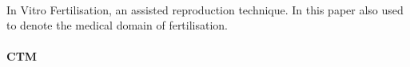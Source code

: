 \paragraph{\IVF{}} 
In Vitro Fertilisation, an assisted reproduction technique.
In this paper also used to denote the medical domain of fertilisation.

\paragraph{\PRN{}}

\paragraph{\project{}}

\paragraph{\projectdata{}}

\paragraph{\ivfsystem{}}

\paragraph{\ivfprototype{}}

\paragraph{CTM}